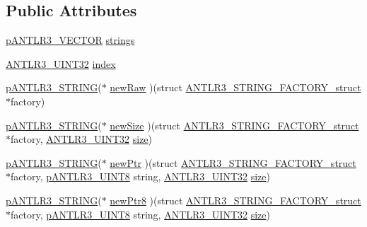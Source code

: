 \subsection*{Public Attributes}
\begin{DoxyCompactItemize}
\item 
\hyperlink{antlr3interfaces_8h_a0dfeeada7529fbe1b968be84079b828f}{p\-A\-N\-T\-L\-R3\-\_\-\-V\-E\-C\-T\-O\-R} \hyperlink{struct_a_n_t_l_r3___s_t_r_i_n_g___f_a_c_t_o_r_y__struct_adac80c0382761ae27e966c76b10cedd4}{strings}
\item 
\hyperlink{antlr3defs_8h_ac41f744abd0fd25144b9eb9d11b1dfd1}{A\-N\-T\-L\-R3\-\_\-\-U\-I\-N\-T32} \hyperlink{struct_a_n_t_l_r3___s_t_r_i_n_g___f_a_c_t_o_r_y__struct_a489bb691b135213bfc2141c5266f7891}{index}
\item 
\hyperlink{antlr3interfaces_8h_a36bbe7362079348864db4b4dbdcce56b}{p\-A\-N\-T\-L\-R3\-\_\-\-S\-T\-R\-I\-N\-G}($\ast$ \hyperlink{struct_a_n_t_l_r3___s_t_r_i_n_g___f_a_c_t_o_r_y__struct_a5d26214a809d4218b4d733015599ce47}{new\-Raw} )(struct \hyperlink{struct_a_n_t_l_r3___s_t_r_i_n_g___f_a_c_t_o_r_y__struct}{A\-N\-T\-L\-R3\-\_\-\-S\-T\-R\-I\-N\-G\-\_\-\-F\-A\-C\-T\-O\-R\-Y\-\_\-struct} $\ast$factory)
\item 
\hyperlink{antlr3interfaces_8h_a36bbe7362079348864db4b4dbdcce56b}{p\-A\-N\-T\-L\-R3\-\_\-\-S\-T\-R\-I\-N\-G}($\ast$ \hyperlink{struct_a_n_t_l_r3___s_t_r_i_n_g___f_a_c_t_o_r_y__struct_aea18c862567e788758f8a3b2f8d7f3e3}{new\-Size} )(struct \hyperlink{struct_a_n_t_l_r3___s_t_r_i_n_g___f_a_c_t_o_r_y__struct}{A\-N\-T\-L\-R3\-\_\-\-S\-T\-R\-I\-N\-G\-\_\-\-F\-A\-C\-T\-O\-R\-Y\-\_\-struct} $\ast$factory, \hyperlink{antlr3defs_8h_ac41f744abd0fd25144b9eb9d11b1dfd1}{A\-N\-T\-L\-R3\-\_\-\-U\-I\-N\-T32} \hyperlink{qmb_8m_a34efcbeb95e7c3e7e0050034d30c01cd}{size})
\item 
\hyperlink{antlr3interfaces_8h_a36bbe7362079348864db4b4dbdcce56b}{p\-A\-N\-T\-L\-R3\-\_\-\-S\-T\-R\-I\-N\-G}($\ast$ \hyperlink{struct_a_n_t_l_r3___s_t_r_i_n_g___f_a_c_t_o_r_y__struct_a6cb6566b577eb18979692b1f999f6a0c}{new\-Ptr} )(struct \hyperlink{struct_a_n_t_l_r3___s_t_r_i_n_g___f_a_c_t_o_r_y__struct}{A\-N\-T\-L\-R3\-\_\-\-S\-T\-R\-I\-N\-G\-\_\-\-F\-A\-C\-T\-O\-R\-Y\-\_\-struct} $\ast$factory, \hyperlink{antlr3defs_8h_a95c800abcac5d607fd9e3e775ace78c5}{p\-A\-N\-T\-L\-R3\-\_\-\-U\-I\-N\-T8} string, \hyperlink{antlr3defs_8h_ac41f744abd0fd25144b9eb9d11b1dfd1}{A\-N\-T\-L\-R3\-\_\-\-U\-I\-N\-T32} \hyperlink{qmb_8m_a34efcbeb95e7c3e7e0050034d30c01cd}{size})
\item 
\hyperlink{antlr3interfaces_8h_a36bbe7362079348864db4b4dbdcce56b}{p\-A\-N\-T\-L\-R3\-\_\-\-S\-T\-R\-I\-N\-G}($\ast$ \hyperlink{struct_a_n_t_l_r3___s_t_r_i_n_g___f_a_c_t_o_r_y__struct_aa8e840afaab19629b182b152b6b203eb}{new\-Ptr8} )(struct \hyperlink{struct_a_n_t_l_r3___s_t_r_i_n_g___f_a_c_t_o_r_y__struct}{A\-N\-T\-L\-R3\-\_\-\-S\-T\-R\-I\-N\-G\-\_\-\-F\-A\-C\-T\-O\-R\-Y\-\_\-struct} $\ast$factory, \hyperlink{antlr3defs_8h_a95c800abcac5d607fd9e3e775ace78c5}{p\-A\-N\-T\-L\-R3\-\_\-\-U\-I\-N\-T8} string, \hyperlink{antlr3defs_8h_ac41f744abd0fd25144b9eb9d11b1dfd1}{A\-N\-T\-L\-R3\-\_\-\-U\-I\-N\-T32} \hyperlink{qmb_8m_a34efcbeb95e7c3e7e0050034d30c01cd}{size})

\end{DoxyCompactItemize}
